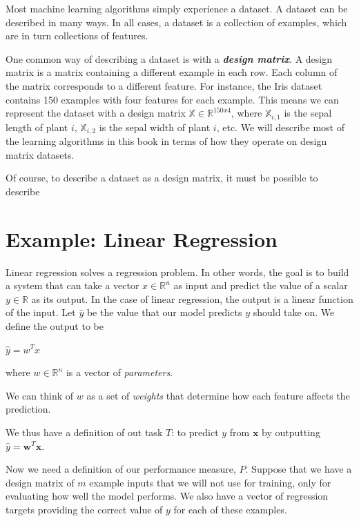 \documentclass{report}
\begin{document}
\noindent Most machine learning algorithms simply experience a dataset. A dataset can be described in many ways. In all cases, a dataset is a collection of examples, which are in turn collections of features.\newline

\noindent One common way of describing a dataset is with a \textbf{\textit{design matrix}}. A design matrix is a matrix containing a different example in each row. Each column of the matrix corresponds to a different feature. For instance, the Iris dataset contains 150 examples with four features for each example. This means we can represent the dataset with a design matrix $\mathbb{X} \in \mathbb{R}^{150x4}$, where $\mathbb{X}_{i,1}$ is the sepal length of plant $i$, $\mathbb{X}_{i,2}$ is the sepal width of plant $i$, etc. We will describe most of the learning algorithms in this book in terms of how they operate on design matrix datasets.\newline

\noindent Of course, to describe a dataset as a design matrix, it must be possible to describe 



\section{Example: Linear Regression}
Linear regression solves a regression problem. In other words, the goal is to build a system that can take a vector $x \in \mathbb{R}^n$ as input and predict the value of a scalar $y \in \mathbb{R}$ as its output. In the case of linear regression, the output is a linear function of the input. Let $\hat{y}$ be the value that our model predicts $y$ should take on. We define the output to be\newline
    \centerline{$\hat{y}= w^T x $}\newline
where $w \in \mathbb{R}^n$ is a vector of \textit{parameters}.\newline

We can think of $w$ as a set of \textit{weights} that determine how each feature affects the prediction.\newline

We thus have a definition of out task $T$: to predict $y$ from $\mathbf{x}$ by outputting $\hat{y}=\mathbf{w}^T\mathbf{x}$.\newline

Now we need a definition of our performance measure, $P$. Suppose that we have a design matrix of $m$ example inputs that we will not use for training, only for evaluating how well the model performs. We also have a vector of regression targets providing the correct value of $y$ for each of these examples. 
\end{document}
